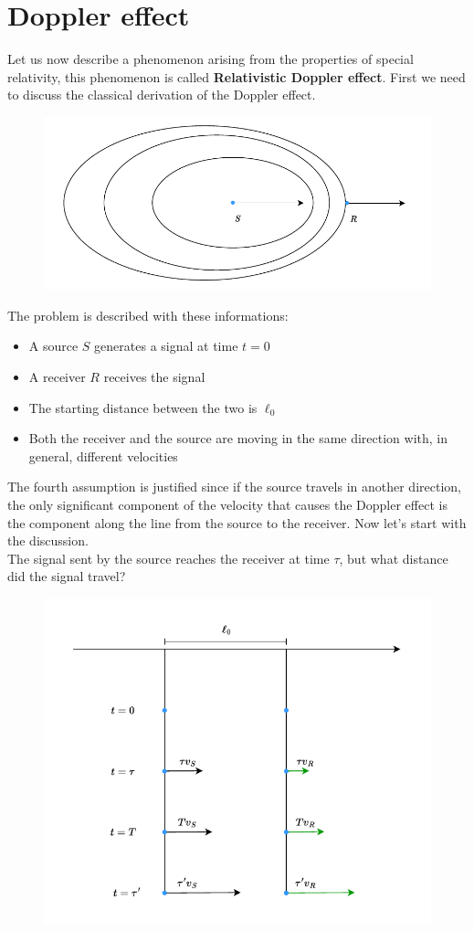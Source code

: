 \section{Doppler effect}
Let us now describe a phenomenon arising from the properties of special relativity, this phenomenon is called \textbf{Relativistic Doppler effect}. First we need to discuss the classical derivation of the Doppler effect.
\begin{figure}[H]
  \centering
  \includegraphics[width=1\linewidth]{res/svg/classical_doppler_diagram.drawio}
\end{figure}
The problem is described with these informations:
\begin{itemize}
  \item A source $S$ generates a signal at time $t=0$
  \item A receiver $R$ receives the signal
  \item The starting distance between the two is $\ell_0$
  \item Both the receiver and the source are moving in the same direction with, in general, different velocities
\end{itemize}
The fourth assumption is justified since if the source travels in another direction, the only significant component of the velocity that causes the Doppler effect is the component along the line from the source to the receiver.
Now let's start with the discussion.\\
The signal sent by the source reaches the receiver at time $\tau$, but what distance did the signal travel?\\
\begin{figure}[H]
  \centering
  \includegraphics[width=0.8\linewidth]{res/svg/classical_doppler_distances.drawio}
\end{figure}
